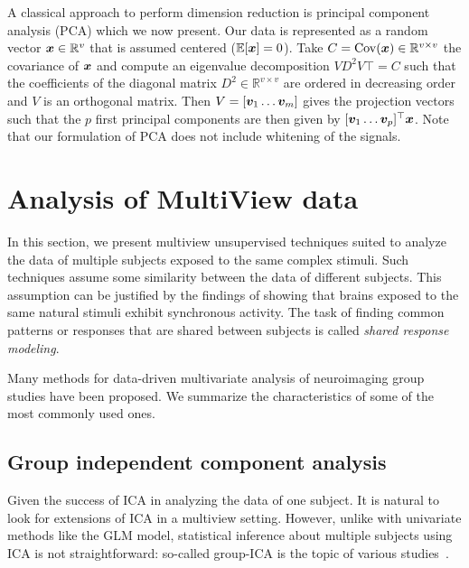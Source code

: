 A classical approach to perform dimension reduction is principal component
analysis (PCA) which we now present.
Our data is represented as a random vector $\boldsymbol{x} \in \mathbb{R}^v$ that is assumed
centered ($\mathbb{E}[\boldsymbol{x}] = 0$). Take $C = \operatorname*{Cov}(\boldsymbol{x}) \in \mathbb{R}^{v \times v}$ the
covariance of $\boldsymbol{x}$ and compute an eigenvalue decomposition $VD^2V {\top} = C$
such that the coefficients of the diagonal matrix $D^2 \in \mathbb{R}^{v
  \times v}$ are ordered in decreasing order and $V$ is an orthogonal matrix.
Then $V = [\boldsymbol{v}_1 \dots \boldsymbol{v}_m]$ gives the projection vectors such that the $p$ first
principal components are then given by $[\boldsymbol{v}_1 \dots \boldsymbol{v}_p]^{\top} \boldsymbol{x}$. Note
that our formulation of PCA does not include whitening of the signals.



\section{Analysis of MultiView data}
In this section, we present multiview unsupervised techniques suited to
analyze the data of multiple subjects exposed to the same complex stimuli. Such
techniques assume some similarity between the data of different subjects. This
assumption can be justified by the findings of \cite{hasson2004intersubject} showing that brains exposed to the same natural stimuli exhibit synchronous activity.
The task of finding common patterns or responses that are shared between
subjects is called \emph{shared response modeling}.


Many methods for data-driven multivariate analysis of neuroimaging group studies have been proposed. We summarize the characteristics of some of the most commonly used ones.
\subsection{Group independent component analysis}
\label{sec:groupica}
Given the success of ICA in analyzing the data of one subject. It is natural to
look for extensions of ICA in a multiview setting.
However, unlike with univariate methods like the GLM model, statistical inference about multiple subjects using ICA is not straightforward: so-called group-ICA is the topic of various studies~\cite{hyvarinen2013independent}.

